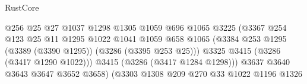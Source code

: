 \begin{lexlean}{RustCore}
\begin{coremodule}
                                                  @256
                                                  @25
                                                  @27
                                                  @1037
                                                  @1298
                                                  @1305
                                                  @1059
                                                  @696
                                                  @1065
                                                  @3225
                                                  (@3367
                                                    @254
                                                    @123
                                                    @25
                                                    @11
                                                    @1295
                                                    @1022
                                                    @1041
                                                    @1059
                                                    @658
                                                    @1065
                                                    (@3384
                                                      @253
                                                      @1295
                                                      (@3389 (@3390 @1295))
                                                      (@3286 (@3395 @253 @25)))
                                                    @3325
                                                    @3415
                                                    (@3286 (@3417 @1290 @1022)))
                                                  @3415
                                                  (@3286 (@3417 @1284 @1298)))
                                                @3637
                                                @3640
                                                @3643
                                                @3647
                                                @3652
                                                @3658)
                                              (@3303
                                                @1308
                                                @209
                                                @270
                                                @33
                                                @1022
                                                @1196
                                                @1326

\end{coremodule}
\end{lexlean}
